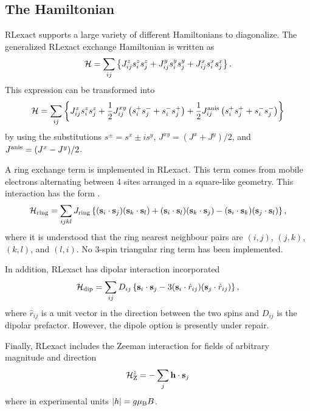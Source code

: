 \documentclass{article}
\begin{document}
\subsection{The Hamiltonian}
RLexact supports a large variety of different Hamiltonians to diagonalize. 
The generalized RLexact exchange Hamiltonian is written as
\begin{equation}
{\cal H} = \sum_{ij} \left\{ J^z_{ij} s^z_i s^z_j + J^y_{ij} s^y_i s^y_j + J^x_{ij} s^x_i s^x_j \right\} .
\end{equation}
This expression can be transformed into
\begin{equation} \label{eq:H_ex}
{\cal H} = \sum_{ij} \left\{ J^z_{ij} s^z_i s^z_j +  \frac{1}{2} J^{xy}_{ij} \left(  s^+_i s^-_j + s^-_i s^+_j \right)
  +  \frac{1}{2} J^{\rm anis}_{ij} \left(  s^+_i s^+_j + s^-_i s^-_j \right) \right\}
\end{equation}
by using the substitutions $s^\pm = s^x \pm i s^y$, $J^{xy} = (J^x + J^y)/2$, and $J^{\rm anis} = (J^x - J^y)/2$.

A ring exchange term is implemented in RLexact. This term comes from mobile electrons alternating between 4 sites arranged in a square-like geometry. This interaction has the form \cite{ring}.
\begin{equation}
{\cal H}_{\rm ring} = \sum_{ijkl} J_{\rm ring}\left\{ ({\bf s}_i \cdot {\bf s}_j) ({\bf s}_k \cdot {\bf s}_l) +
 ({\bf s}_i \cdot {\bf s}_l) ({\bf s}_k \cdot {\bf s}_j) - ({\bf s}_i \cdot {\bf s}_k) ({\bf s}_j \cdot {\bf s}_l) \right\} ,
\end{equation}
where it is understood that the ring nearest neighbour pairs are $(i,j)$, $(j,k)$, $(k,l)$, and $(l,i)$. 
No 3-spin triangular ring term has been implemented.

In addition, RLexact has dipolar interaction incorporated
\begin{equation}
{\cal H}_{\rm dip} = \sum_{ij} D_{ij} \left\{ {\bf s}_i \cdot {\bf s}_j - 3 ({\bf s}_i \cdot \hat{r}_{ij})({\bf s}_j \cdot \hat{r}_{ij} ) \right\} ,
\end{equation}
where $\hat{r}_{ij}$ is a unit vector in the direction between the two spins and $D_{ij}$ is the dipolar prefactor.
However, the dipole option is presently under repair.

Finally, RLexact includes the Zeeman interaction for fields of arbitrary magnitude and direction
\begin{align}
{\cal H}_{\rm Z}^z = - \sum_j \mathbf{h} \cdot \mathbf{s}_j \\
\end{align}
where in experimental units $|h| = g \mu_{\rm B} B$.\\
\end{document}
